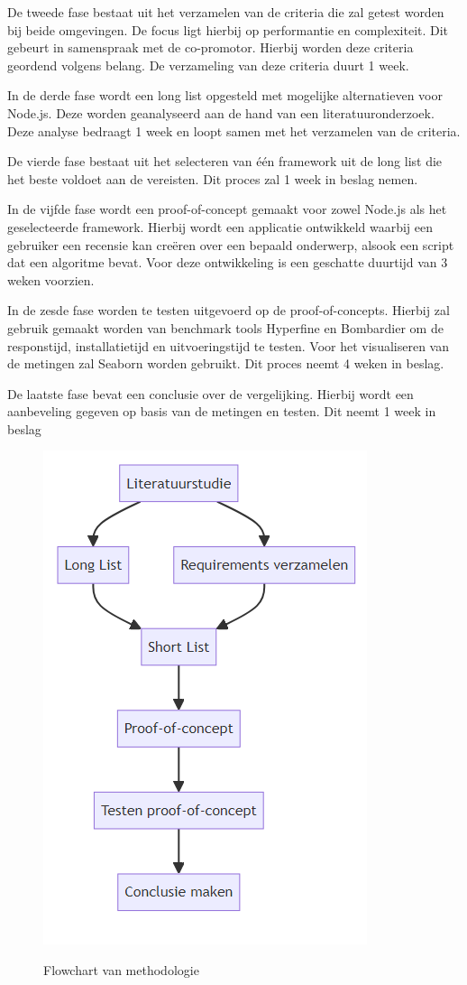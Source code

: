De tweede fase bestaat uit het verzamelen van de criteria die zal getest worden bij beide omgevingen. 
De focus ligt hierbij op performantie en complexiteit.
Dit gebeurt in samenspraak met de co-promotor. Hierbij worden deze criteria geordend volgens belang. 
De verzameling van deze criteria duurt 1 week.

In de derde fase wordt een long list opgesteld met mogelijke alternatieven voor Node.js. 
Deze worden geanalyseerd aan de hand van een literatuuronderzoek. Deze analyse bedraagt 1 week en loopt samen met het verzamelen van de criteria.

De vierde fase bestaat uit het selecteren van één framework uit de long list die het beste voldoet aan de vereisten. 
Dit proces zal 1 week in beslag nemen.

In de vijfde fase wordt een proof-of-concept gemaakt voor zowel Node.js als het geselecteerde framework. 
Hierbij wordt een applicatie ontwikkeld waarbij een gebruiker een recensie kan creëren over een bepaald onderwerp, 
alsook een script dat een algoritme bevat.
Voor deze ontwikkeling is een geschatte duurtijd van 3 weken voorzien.

In de zesde fase worden te testen uitgevoerd op de proof-of-concepts. 
Hierbij zal gebruik gemaakt worden van benchmark tools Hyperfine en Bombardier om de responstijd, installatietijd en uitvoeringstijd te testen.
Voor het visualiseren van de metingen zal Seaborn worden gebruikt.
Dit proces neemt 4 weken in beslag.

De laatste fase bevat een conclusie over de vergelijking. 
Hierbij wordt een aanbeveling gegeven op basis van de metingen en testen.
Dit neemt 1 week in beslag
\begin{figure}[h]
    \centering
    \includegraphics[width=.4\textwidth]{graphics/flowchart.png}
    \caption{\label{fig:flowchart}}Flowchart van methodologie
\end{figure}

